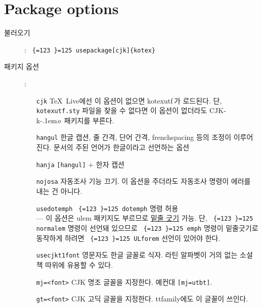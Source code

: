 \documentclass[dvipdfmx,b5paper]{article}
\def\cs#1{\texttt{\color{teal}\char92 \chardef\{=123 \chardef\}=125 #1}}
\def\cjkko{\mbox{CJK-\textsf{k}\kern-.1em\textit{o}}}
\begin{document}
\section{Package options}
  \begin{description}
    \item[불러오기]: \quad\cs{usepackage[cjk]\{kotex\}}
      \medskip
    \item[패키지 옵션]:
      \begin{itemize}
        \item[\texttt{cjk}] \TeX\ Live에선 이 옵션이 없으면 kotexutf\,가
          로드된다. 단, \verb|kotexutf.sty| 파일을 찾을 수 없다면
          이 옵션이 없더라도 \cjkko\ 패키지를 부른다.
        \item[\texttt{hangul}] 한글 캡션, 줄 간격, 단어 간격, frenchspacing
          등의 조정이 이루어진다. 문서의 주된 언어가 한글이라고 선언하는 옵션
        \item[\texttt{hanja}] \verb|[hangul]| $+$ 한자 캡션
        \item[\texttt{nojosa}] 자동조사 기능 끄기. 이 옵션을 주더라도
          자동조사 명령이 에러를 내는 건 아니다.
        \item[\texttt{usedotemph}] \cs{dotemph} 명령 허용\\
          --- 이 옵션은 ulem 패키지도 부르므로 \uline{밑줄 긋기} 가능.
          단, \cs{normalem} 명령이 선언돼 있으므로 \cs{emph} 명령이
          밑줄긋기로 동작하게 하려면 \cs{ULforem} 선언이 있어야 한다.
        \item[\texttt{usecjkt1font}] 영문자도 한글 글꼴로 식자.
           라틴 알파벳이 거의 없는 소설책 따위에 유용할 수 있다.
        \item[\texttt{mj=<font>}] CJK 명조 글꼴을 지정한다. 예컨대
          \verb|[mj=utbt]|.
        \item[\texttt{gt=<font>}] CJK 고딕 글꼴을 지정한다. ttfamily에도
          이 글꼴이 쓰인다.
      \end{itemize}
  \end{description}
\end{document}
